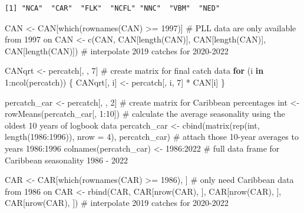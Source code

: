 \documentclass[
  letterpaper,
  oneside,
  open=any]{scrbook}
\newenvironment{Shaded}{\begin{snugshade}}{\end{snugshade}}
\newcommand{\AttributeTok}[1]{\textcolor[rgb]{0.40,0.45,0.13}{#1}}
\newcommand{\CommentTok}[1]{\textcolor[rgb]{0.37,0.37,0.37}{#1}}
\newcommand{\ControlFlowTok}[1]{\textcolor[rgb]{0.00,0.23,0.31}{\textbf{#1}}}
\newcommand{\DecValTok}[1]{\textcolor[rgb]{0.68,0.00,0.00}{#1}}
\newcommand{\FunctionTok}[1]{\textcolor[rgb]{0.28,0.35,0.67}{#1}}
\newcommand{\NormalTok}[1]{\textcolor[rgb]{0.00,0.23,0.31}{#1}}
\newcommand{\OtherTok}[1]{\textcolor[rgb]{0.00,0.23,0.31}{#1}}
\newcommand{\SpecialCharTok}[1]{\textcolor[rgb]{0.37,0.37,0.37}{#1}}
\begin{document}
\begin{verbatim}
[1] "NCA"  "CAR"  "FLK"  "NCFL" "NNC"  "VBM"  "NED" 
\end{verbatim}

\begin{Shaded}
\begin{Highlighting}[]
\NormalTok{CAN }\OtherTok{\textless{}{-}}\NormalTok{ CAN[}\FunctionTok{which}\NormalTok{(}\FunctionTok{rownames}\NormalTok{(CAN) }\SpecialCharTok{\textgreater{}=} \DecValTok{1997}\NormalTok{)]  }\CommentTok{\# PLL data are only available from 1997 on }
\NormalTok{CAN }\OtherTok{\textless{}{-}} \FunctionTok{c}\NormalTok{(CAN, CAN[}\FunctionTok{length}\NormalTok{(CAN)], CAN[}\FunctionTok{length}\NormalTok{(CAN)], CAN[}\FunctionTok{length}\NormalTok{(CAN)])  }\CommentTok{\# interpolate 2019 catches for 2020{-}2022}

\NormalTok{CANqrt }\OtherTok{\textless{}{-}}\NormalTok{ percatch[, , }\DecValTok{7}\NormalTok{]   }\CommentTok{\# create matrix for final catch data}
\ControlFlowTok{for}\NormalTok{ (i }\ControlFlowTok{in} \DecValTok{1}\SpecialCharTok{:}\FunctionTok{ncol}\NormalTok{(percatch))  \{ }
\NormalTok{  CANqrt[, i] }\OtherTok{\textless{}{-}}\NormalTok{ percatch[, i, }\DecValTok{7}\NormalTok{] }\SpecialCharTok{*}\NormalTok{ CAN[i]  \}}

\NormalTok{percatch\_car }\OtherTok{\textless{}{-}}\NormalTok{ percatch[, , }\DecValTok{2}\NormalTok{] }\CommentTok{\# create matrix for Caribbean percentages}
\NormalTok{int }\OtherTok{\textless{}{-}} \FunctionTok{rowMeans}\NormalTok{(percatch\_car[, }\DecValTok{1}\SpecialCharTok{:}\DecValTok{10}\NormalTok{]) }\CommentTok{\# calculate the average seasonality using the oldest 10 years of logbook data}
\NormalTok{percatch\_car }\OtherTok{\textless{}{-}} \FunctionTok{cbind}\NormalTok{(}\FunctionTok{matrix}\NormalTok{(}\FunctionTok{rep}\NormalTok{(int, }\FunctionTok{length}\NormalTok{(}\DecValTok{1986}\SpecialCharTok{:}\DecValTok{1996}\NormalTok{)), }\AttributeTok{nrow =} \DecValTok{4}\NormalTok{), percatch\_car)  }\CommentTok{\# attach those 10{-}year averages to years 1986:1996}
\FunctionTok{colnames}\NormalTok{(percatch\_car) }\OtherTok{\textless{}{-}} \DecValTok{1986}\SpecialCharTok{:}\DecValTok{2022}   \CommentTok{\# full data frame for Caribbean seasonality 1986 {-} 2022}

\NormalTok{CAR }\OtherTok{\textless{}{-}}\NormalTok{ CAR[}\FunctionTok{which}\NormalTok{(}\FunctionTok{rownames}\NormalTok{(CAR) }\SpecialCharTok{\textgreater{}=} \DecValTok{1986}\NormalTok{), ]  }\CommentTok{\# only need Caribbean data from 1986 on }
\NormalTok{CAR }\OtherTok{\textless{}{-}} \FunctionTok{rbind}\NormalTok{(CAR, CAR[}\FunctionTok{nrow}\NormalTok{(CAR), ], CAR[}\FunctionTok{nrow}\NormalTok{(CAR), ], CAR[}\FunctionTok{nrow}\NormalTok{(CAR), ])  }\CommentTok{\# interpolate 2019 catches for 2020{-}2022}


\end{Highlighting}
\end{Shaded}
\end{document}
